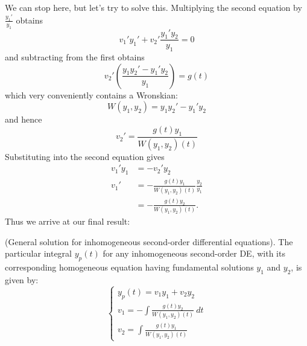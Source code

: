 \documentclass{article}
\begin{document}
We can stop here, but let's try to solve this. Multiplying the second equation by $\frac{y_1'}{y_1}$ obtains
\begin{equation*}
    v_1'y_1' + v_2'\frac{y_1'y_2}{y_1} = 0
\end{equation*}
and subtracting from the first obtains
\begin{equation*}
    v_2'(\frac{y_1y_2' - y_1'y_2}{y_1}) = g(t)
\end{equation*}
which very conveniently contains a Wronskian:
\begin{equation*}
    W(y_1,y_2) = y_1y_2' - y_1'y_2
\end{equation*}
and hence
\begin{equation*}
    v_2' = \frac{g(t)y_1}{W(y_1,y_2)(t)}
\end{equation*}
Substituting into the second equation gives
\begin{equation*}
    \begin{aligned}
        v_1'y_1 &= -v_2'y_2 \\
        v_1' &= -\frac{g(t)y_1}{W(y_1,y_2)(t)}\frac{y_2}{y_1} \\
        &= -\frac{g(t)y_2}{W(y_1,y_2)(t)}.
    \end{aligned}
\end{equation*}
Thus we arrive at our final result:
\begin{theorem}
    (General solution for inhomogeneous second-order differential equations). The particular integral $y_p(t)$ for any inhomogeneous second-order DE, with its corresponding homogeneous equation having fundamental solutions $y_1$ and $y_2$, is given by:
    \begin{equation*}
        \begin{cases}
            y_p(t) = v_1y_1 + v_2y_2 \\
            v_1 = -\int \frac{g(t)y_2}{W(y_1,y_2)(t)} \ dt \\
            v_2 = \int \frac{g(t)y_1}{W(y_1,y_2)(t)}
        \end{cases}
    \end{equation*}
\end{theorem}
\end{document}
